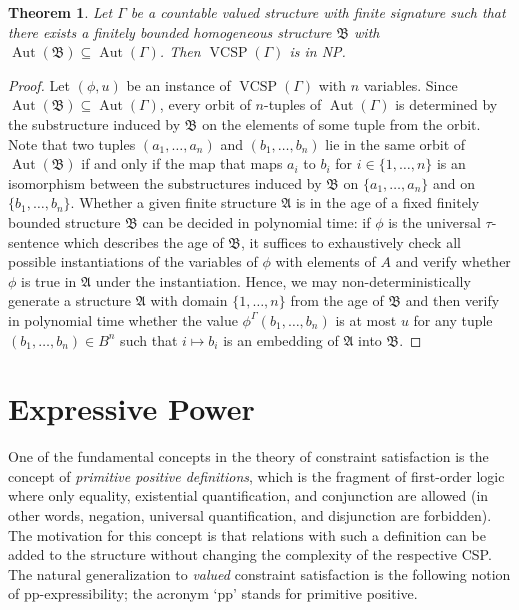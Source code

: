 \documentclass[nonacm]{acmart}
\newcommand{\bA}{{\mathfrak A}}
\newcommand{\bB}{{\mathfrak B}}
\DeclareMathOperator{\Aut}{Aut}
\DeclareMathOperator{\VCSP}{VCSP}
\newtheorem{theorem}{Theorem}[section]
\begin{document}
\begin{theorem}\label{thm:fb-NP}
Let $\Gamma$ be a countable valued structure
with finite signature such that there exists a finitely bounded 
homogeneous structure $\bB$ with $\Aut(\bB) \subseteq \Aut(\Gamma)$. Then $\VCSP(\Gamma)$ is in NP. 
\end{theorem}
\begin{proof}
Let $(\phi,u)$ be an instance of $\VCSP(\Gamma)$ with $n$ variables. Since $\Aut(\bB) \subseteq \Aut(\Gamma)$, every orbit of $n$-tuples of $\Aut(\Gamma)$
is determined by the substructure induced by $\bB$ on the elements of some tuple from the orbit. Note that two tuples $(a_1, \dots, a_n)$ and $(b_1, \dots, b_n)$ lie in the same orbit of $\Aut(\bB)$ if and only if the map that maps $a_i$ to $b_i$ for $i\in \{1,\dots,n\}$ is an isomorphism between the substructures induced by $\bB$ on $\{a_1, \dots, a_n\}$ and on $\{b_1, \dots, b_n\}$. Whether a given finite structure $\bA$ is in the age of a fixed finitely bounded structure $\bB$ can be decided in polynomial time: if $\phi$ is the universal $\tau$-sentence which describes the age of $\bB$,
it suffices 
to exhaustively check all possible instantiations of the variables of $\phi$ with elements of $A$ and verify whether $\phi$ is true in $\bA$ under the instantiation.
Hence, we may non-deterministically generate a structure $\bA$ with domain
$\{1,\dots,n\}$ from the age of $\bB$ 
and then verify in polynomial time whether the 
value $\phi^{\Gamma}(b_1, \dots, b_n)$ is at most $u$ for any tuple $(b_1,\dots,b_n) \in B^n$ 
such that $i \mapsto b_i$ is an embedding of $\bA$ into $\bB$.
\end{proof}


\section{Expressive Power} 
\label{sect:expr}
One of the fundamental concepts in the theory of constraint satisfaction is the concept of \emph{primitive positive definitions}, which is the fragment of first-order logic where only equality, existential quantification, and conjunction are allowed (in other words, negation, universal quantification, and disjunction are forbidden). 
The motivation for this concept is that relations with such a definition can be added to the structure without changing the complexity of the respective CSP. The natural generalization to \emph{valued} constraint satisfaction is the following notion of pp-expressibility; the acronym `pp' stands for primitive positive.
\end{document}
